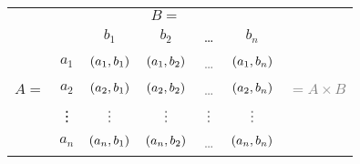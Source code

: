 \begin{tabular}{ccccccc}
&&& \large{$B = $} &&\\
&& $b_1$ & $b_2$ & \dots & $b_n$\\
&$a_1$& \textcolor{gray}{$\left(a_1, b_1\right)$} & \textcolor{gray}{$\left(a_1, b_2\right)$} & \textcolor{gray}{\dots} & \textcolor{gray}{$\left(a_1, b_n\right)$}\\
\large{$A =$} &$a_2$   & \textcolor{gray}{$\left(a_2, b_1\right)$} & \textcolor{gray}{$\left(a_2, b_2\right)$} & \textcolor{gray}{\dots} & \textcolor{gray}{$\left(a_2, b_n\right)$} & \textcolor{gray}{\large{$= A \times B$}}\\
&\vdots & \textcolor{gray}{\vdots}& \textcolor{gray}{\vdots}& \textcolor{gray}{\vdots}& \textcolor{gray}{\vdots}\\
&$a_n$& \textcolor{gray}{$\left(a_n, b_1\right)$} & \textcolor{gray}{$\left(a_n, b_2\right)$} & \textcolor{gray}{\dots} & \textcolor{gray}{$\left(a_n, b_n\right)$}
\end{tabular}
